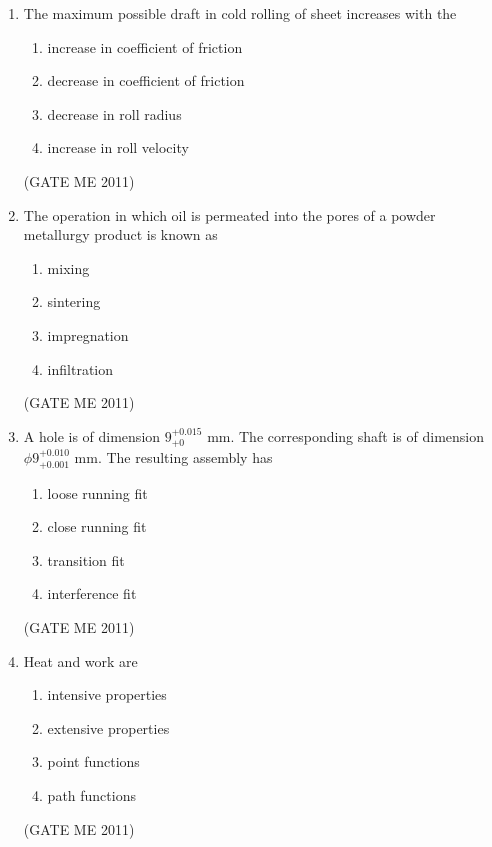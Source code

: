 \documentclass[journal]{IEEEtran}
\begin{document}
\begin{enumerate}
\item The maximum possible draft in cold rolling of sheet increases with the
\begin{enumerate}
\item increase in coefficient of friction  
\item decrease in coefficient of friction  
\item decrease in roll radius  
\item increase in roll velocity  
\end{enumerate}   
\hfill (GATE ME 2011)

\item The operation in which oil is permeated into the pores of a powder metallurgy product is known as
\begin{multicols}{4}
\begin{enumerate}
\item mixing  
\item sintering  
\item impregnation  
\item infiltration  
\end{enumerate}
\end{multicols}   
\hfill (GATE ME 2011)                 

\item A hole is of dimension $9^{+0.015}_{+0}$ mm. The corresponding shaft is of dimension $\phi9^{+0.010}_{+0.001}$ mm. The resulting assembly has
\begin{multicols}{2}
\begin{enumerate}
\item loose running fit  
\item close running fit  
\item transition fit  
\item interference fit  
\end{enumerate}
\end{multicols}   
\hfill (GATE ME 2011)               

\item Heat and work are
\begin{multicols}{2}
\begin{enumerate}
\item intensive properties  
\item extensive properties  
\item point functions  
\item path functions  
\end{enumerate}
\end{multicols}   
\hfill (GATE ME 2011)               


\end{enumerate}
\end{document}
